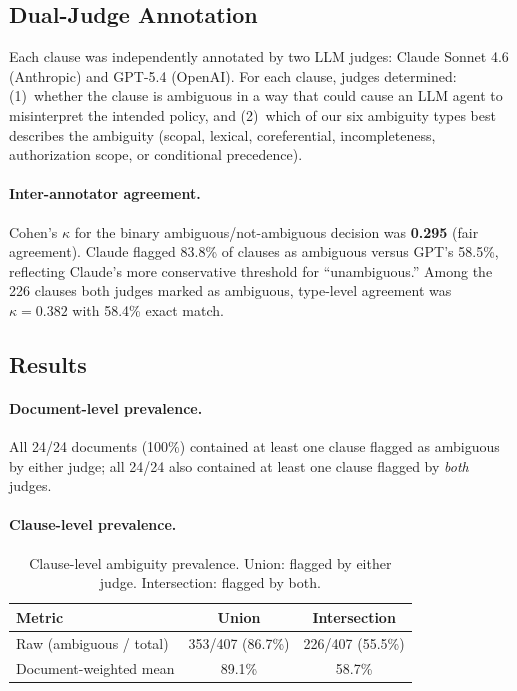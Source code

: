 \subsection{Dual-Judge Annotation}

Each clause was independently annotated by two LLM judges: Claude Sonnet 4.6 (Anthropic) and GPT-5.4 (OpenAI). For each clause, judges determined: (1)~whether the clause is ambiguous in a way that could cause an LLM agent to misinterpret the intended policy, and (2)~which of our six ambiguity types best describes the ambiguity (scopal, lexical, coreferential, incompleteness, authorization scope, or conditional precedence).

\paragraph{Inter-annotator agreement.}
Cohen's $\kappa$ for the binary ambiguous/not-ambiguous decision was \textbf{0.295} (fair agreement). Claude flagged 83.8\% of clauses as ambiguous versus GPT's 58.5\%, reflecting Claude's more conservative threshold for ``unambiguous.'' Among the 226 clauses both judges marked as ambiguous, type-level agreement was $\kappa = 0.382$ with 58.4\% exact match.

\subsection{Results}

\paragraph{Document-level prevalence.}
All 24/24 documents (100\%) contained at least one clause flagged as ambiguous by either judge; all 24/24 also contained at least one clause flagged by \emph{both} judges.

\paragraph{Clause-level prevalence.}

\begin{table}[h]
\centering
\small
\begin{tabular}{lcc}
\toprule
\textbf{Metric} & \textbf{Union} & \textbf{Intersection} \\
\midrule
Raw (ambiguous / total) & 353/407 (86.7\%) & 226/407 (55.5\%) \\
Document-weighted mean  & 89.1\%  & 58.7\% \\
\bottomrule
\end{tabular}
\caption{Clause-level ambiguity prevalence. Union: flagged by either judge. Intersection: flagged by both.}
\label{tab:clause_prevalence}
\end{table}


